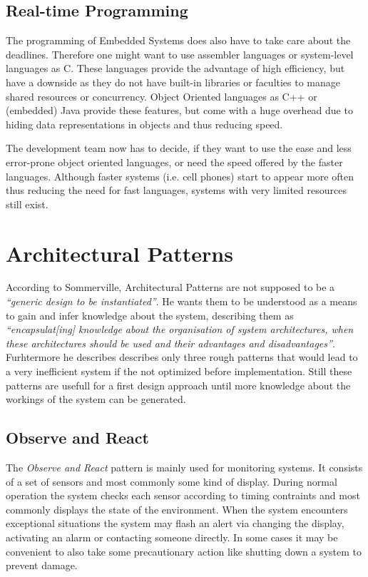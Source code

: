 \documentclass[10pt,a4paper,titlepage,draft]{article} %
\begin{document}
\subsection{Real-time Programming}
The programming of Embedded Systems does also have to take care about the deadlines.
Therefore one might want to use assembler languages or system-level languages as C.
These languages provide the advantage of high efficiency, but have a downside as they do not have built-in libraries or faculties to manage shared resources or concurrency.
Object Oriented languages as C++ or (embedded) Java provide these features, but come with a huge overhead due to hiding data representations in objects and thus reducing speed.

The development team now has to decide, if they want to use the ease and less error-prone object oriented languages, or need the speed offered by the faster languages.
Although faster systems (i.e. cell phones) start to appear more often thus reducing the need for fast languages, systems with very limited resources still exist.


\section{Architectural Patterns}
According to Sommerville, Architectural Patterns are not supposed to be a \textit{``generic design to be instantiated''\cite[p. 547]{sommerville}}.
He wants them to be understood as a means to gain and infer knowledge about the system, describing them as \textit{``encapsulat[ing] knowledge about the organisation of system architectures, when these architectures should be used and their advantages and disadvantages''\cite[p.547]{sommerville}}.
Furhtermore he describes describes only three rough patterns that would lead to a very inefficient system if the not optimized before implementation.
Still these patterns are usefull for a first design approach until more knowledge about the workings of the system can be generated.

\subsection{Observe and React}
The \emph{Observe and React} pattern is mainly used for monitoring systems.
It consists of a set of sensors and most commonly some kind of display.
During normal operation the system checks each sensor according to timing contraints and most commonly displays the state of the environment.
When the system encounters exceptional situations the system may flash an alert via changing the display, activating an alarm or contacting someone directly.
In some cases it may be convenient to also take some precautionary action like shutting down a system to prevent damage.
\end{document}
